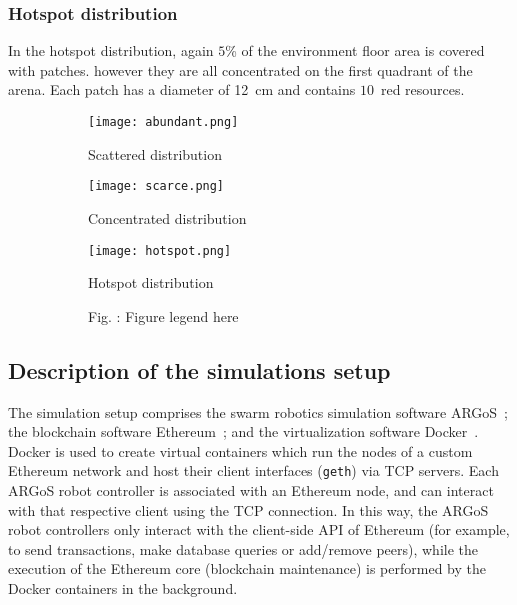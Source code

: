 \documentclass[runningheads]{llncs}
\newcommand{\fillcaption}[1]{Fig. \arabic{figure}: #1 }
\begin{document}
\vspace{-4mm}
\subsubsection{Hotspot distribution} 
In the hotspot distribution, again $5$\% of the environment floor area is covered with patches. however they are all concentrated on the first quadrant of the arena. Each patch has a diameter of 12~cm and contains $10$~red resources. 


\begin{figure}
     \centering
     \begin{subfigure}[b]{0.49\textwidth}
         \centering
         \texttt{[image: abundant.png]}
         \caption{Scattered distribution}
         \label{fig:scattered}
     \end{subfigure}
     \hfill
     \begin{subfigure}[b]{0.49\textwidth}
         \centering
         \texttt{[image: scarce.png]}
         \caption{Concentrated distribution}
         \label{fig:concentrated}
     \end{subfigure}
     \hfill
        \begin{subfigure}[b]{0.49\textwidth}
         \centering
         \texttt{[image: hotspot.png]}
         \caption{Hotspot distribution}
         \label{fig:hotspot}
    \end{subfigure}
    \begin{subfigure}[t]{0.49\textwidth}
        \centering
        \vspace{-35mm}
        \fillcaption{Figure legend here}
    \end{subfigure}

\end{figure}


\subsection{Description of the simulations setup}

The simulation setup comprises the swarm robotics simulation software ARGoS~\cite{pinciroli_2012_si_argos}; the blockchain software Ethereum~\cite{buterin_2014_ethereum}; and the virtualization software Docker~\cite{merkel_2014_docker}. Docker is used to create virtual containers which run the nodes of a custom Ethereum network and host their client interfaces (\texttt{geth}) via TCP servers. Each ARGoS robot controller is associated with an Ethereum node, and can interact with that respective client using the TCP connection.
In this way, the ARGoS robot controllers only interact with the client-side API of Ethereum (for example, to send transactions, make database queries or add/remove peers), while the execution of the Ethereum core (blockchain maintenance) is performed by the Docker containers in the background.
 
\end{document}
